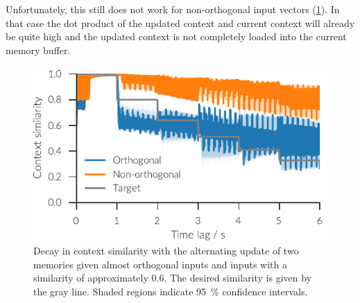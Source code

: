 Unfortunately, this still does not work for non-orthogonal input vectors (\cref{fig:amb}).
In that case the dot product of the updated context and current context will already be quite high and the updated context is not completely loaded into the current memory buffer.
\begin{figure}
    \centering
    \includegraphics{figures/context-analysis/amb}
    \caption[Decay in context similarity with the alternating update of two memories]{
        Decay in context similarity with the alternating update of two memories given almost orthogonal inputs and inputs with a similarity of approximately \num{0.6}.
        The desired similarity is given by the gray line. Shaded regions indicate \SI{95}{\percent} confidence intervals.}\label{fig:amb}
\end{figure}


